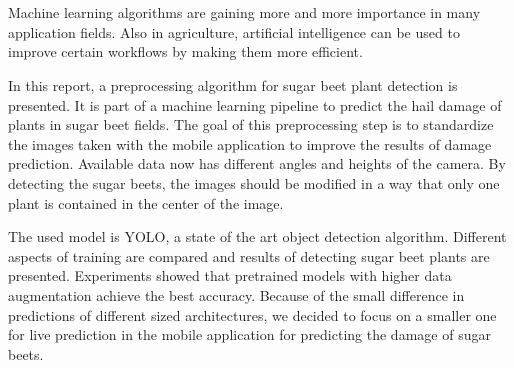 \chapter{\abstractname}

Machine learning algorithms are gaining more and more importance in many application fields. Also in agriculture, artificial intelligence can be used to improve certain workflows by making them more efficient. 

In this report, a preprocessing algorithm for sugar beet plant detection is presented. It is part of a machine learning pipeline to predict the hail damage of plants in sugar beet fields. The goal of this preprocessing step is to standardize the images taken with the mobile application to improve the results of damage prediction. Available data now has different angles and heights of the camera. By detecting the sugar beets, the images should be modified in a way that only one plant is contained in the center of the image.

The used model is YOLO, a state of the art object detection algorithm. Different aspects of training are compared and results of detecting sugar beet plants are presented. Experiments showed that pretrained models with higher data augmentation achieve the best accuracy. Because of the small difference in predictions of different sized architectures, we decided to focus on a smaller one for live prediction in the mobile application for predicting the damage of sugar beets.